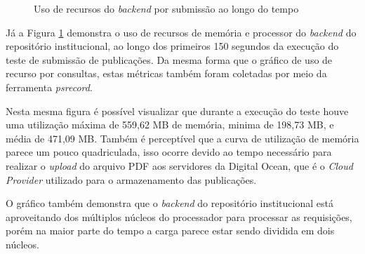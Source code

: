 \begin{figure}[H]
    \caption{Uso de recursos do \emph{backend} por submissão ao longo do tempo}
    \centering
    \label{fig:resource-usage-create-research}
\end{figure}

Já a Figura \ref{fig:resource-usage-create-research} demonstra o uso de recursos
de memória e processor do \emph{backend} do repositório institucional, ao longo
dos primeiros 150 segundos da execução do teste de submissão de publicações.
Da mesma forma que o gráfico de uso de recurso por consultas, estas métricas
também foram coletadas por meio da ferramenta \emph{psrecord}.

Nesta mesma figura é possível visualizar que durante a execução do teste houve uma
utilização máxima de 559,62 MB de memória, minima de 198,73 MB, e média de 471,09 MB.
Também é perceptível que a curva de utilização de memória parece um pouco quadriculada,
isso ocorre devido ao tempo necessário para realizar o \emph{upload} do arquivo PDF
aos servidores da Digital Ocean, que é o \emph{Cloud Provider} utilizado para o
armazenamento das publicações.

O gráfico também demonstra que o \emph{backend} do repositório institucional
está aproveitando dos múltiplos núcleos do processador para processar as requisições,
porém na maior parte do tempo a carga parece estar sendo dividida em dois núcleos.
